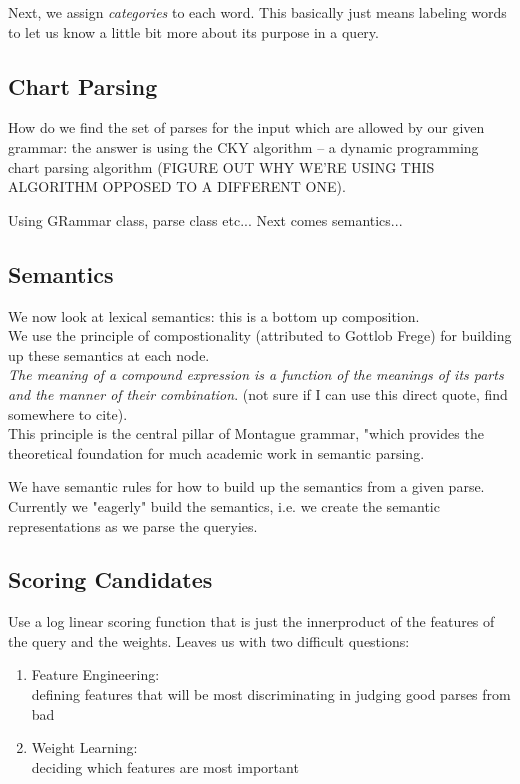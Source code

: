 \documentclass[pageno]{jpaper}
\begin{document}
Next, we assign \textit{categories} to each word. This basically just means labeling words to let us know a little bit more about its purpose in a query. \\

\subsection{Chart Parsing}
How do we find the set of parses for the input which are allowed by our given grammar: the answer is using the CKY algorithm -- a dynamic programming chart parsing algorithm  (FIGURE OUT WHY WE'RE USING THIS ALGORITHM OPPOSED TO A DIFFERENT ONE). 

Using GRammar class, parse class etc...
Next comes semantics...
\subsection{Semantics}
We now look at lexical semantics: this is a bottom up composition.\\
We use the principle of compostionality (attributed to Gottlob Frege) for building up these semantics at each node.\\

\textit{The meaning of a compound expression is a function of the meanings of its parts and the manner of their combination}. (not sure if I can use this direct quote, find somewhere to cite).\\

This principle is the central pillar of Montague grammar, "which provides the theoretical foundation for much academic work in semantic parsing. 

We have semantic rules for how to build up the semantics from a given parse. Currently we "eagerly" build the semantics, i.e. we create the semantic representations as we parse the queryies.

\subsection{Scoring Candidates}
Use a log linear scoring function that is just the innerproduct of the features of the query and the weights. Leaves us with two difficult questions:
\begin{enumerate}
\item Feature Engineering: \\ defining features that will be most discriminating in judging good parses from bad
\item Weight Learning:\\deciding which features are most important
\end{enumerate}
\end{document}
